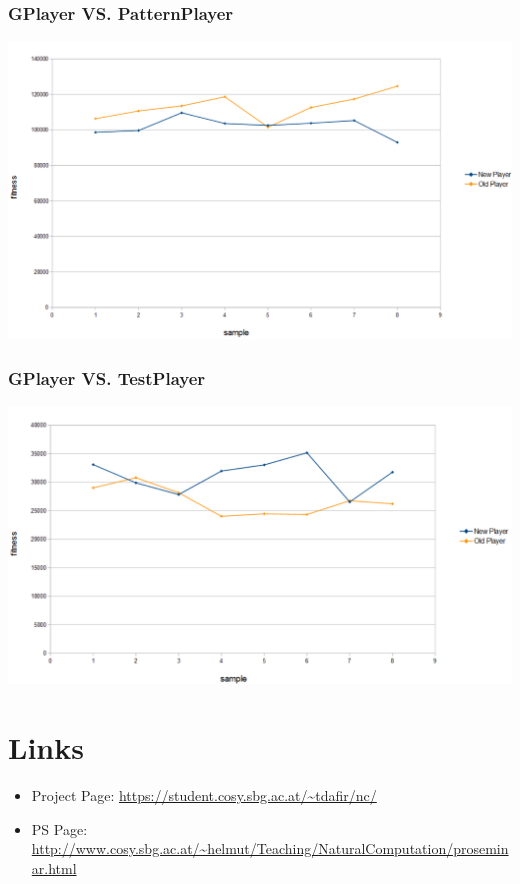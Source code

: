 \documentclass[12pt,fleqn,a4paper]{article}
\begin{document}
\subsubsection{GPlayer VS. PatternPlayer}
\begin{center}
	\includegraphics[width=1\textwidth]{gp_vs_pp.png}
\end{center}

\subsubsection{GPlayer VS. TestPlayer}
\begin{center}
	\includegraphics[width=1\textwidth]{gp_vs_tp.png}
\end{center}

\newpage


\section{Links}

\begin{itemize}
\item Project Page: \url{https://student.cosy.sbg.ac.at/~tdafir/nc/}
\item PS Page:
\url{http://www.cosy.sbg.ac.at/~helmut/Teaching/NaturalComputation/proseminar.html}

\end{itemize}

\nocite{*}

\end{document}
